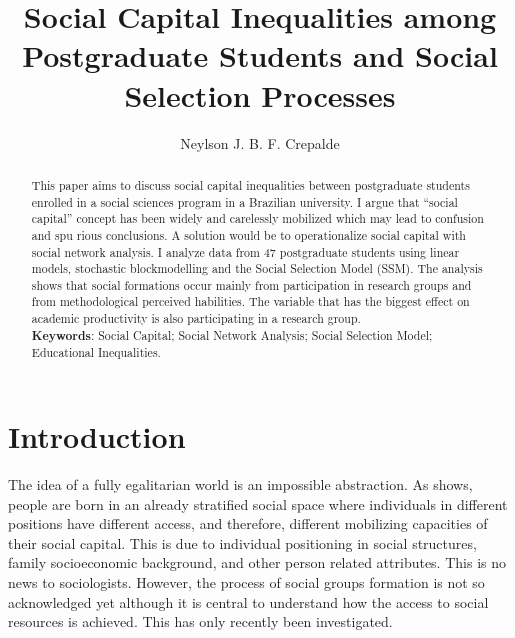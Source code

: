 \documentclass[12pt, english]{article}
\title{Social Capital Inequalities among Postgraduate Students and Social Selection Processes}
\author{Neylson J. B. F. Crepalde\inst{1}}
\begin{document}
 

\maketitle

\begin{abstract}
  This paper aims to discuss social capital inequalities between postgraduate students enrolled in a social sciences program in a Brazilian university. I argue that ``social capital'' concept has been widely and carelessly mobilized which may lead to confusion and spu
  rious conclusions. A solution would be to operationalize social capital with social network analysis. I analyze data from 47 postgraduate students using linear models, stochastic blockmodelling and the Social Selection Model (SSM). The analysis shows that social formations occur mainly from participation in research groups and from methodological perceived habilities. The variable that has the biggest effect on academic productivity is also participating in a research group.
  \\
  \textbf{Keywords}: Social Capital; Social Network Analysis; Social Selection Model; Educational Inequalities.
\end{abstract}
     


\section{Introduction}

The idea of a fully egalitarian world is an impossible abstraction. As \cite{lin1999building} shows, people are born in an already stratified social space where individuals in different positions have different access, and therefore, different mobilizing capacities of their social capital. This is due to individual positioning in social structures, family socioeconomic background, and other person related attributes. This is no news to sociologists. However, the process of social groups formation is not so acknowledged yet although it is central to understand how the access to social resources is achieved. This has only recently been investigated.
\end{document}
